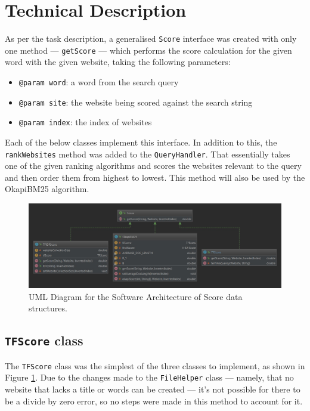 \section{Technical Description}
As per the task description, a generalised {\tt Score} interface was created with only one method — {\tt getScore} — which performs the score calculation for the given word with the given website, taking the following parameters:
\begin{itemize}
    \item {\tt @param word}: a word from the search query
    \item {\tt @param site}: the website being scored against the search string
    \item {\tt @param index}: the index of websites
\end{itemize}
Each of the below classes implement this interface. In addition to this, the {\tt rankWebsites} method was added to the {\tt QueryHandler}. That essentially takes one of the given ranking algorithms and scores the websites relevant to the query and then order them from highest to lowest. This method will also be used by the OkapiBM25 algorithm.

\begin{figure}[t]
    \centering
    \includegraphics[width=\textwidth]{figures/diagram-score}
    \caption{UML Diagram for the Software Architecture of Score data structures.}
    \label{fig:score:uml}
\end{figure}

\subsection{{\tt TFScore} class}
The {\tt TFScore} class was the simplest of the three classes to implement, as shown in Figure \ref{fig:score:uml}.
Due to the changes made to the {\tt FileHelper} class — namely, that no website that lacks a title or words can be created — it's not possible for there to be a divide by zero error, so no steps were made in this method to account for it.

